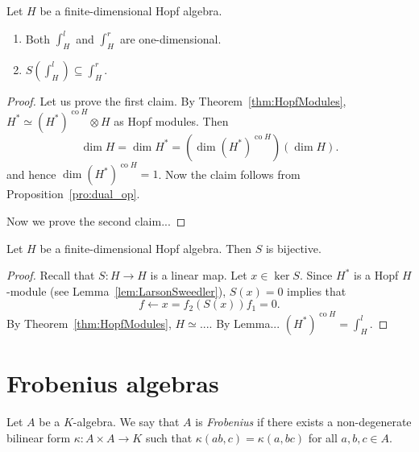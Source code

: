 \begin{theorem}
  Let $H$ be a finite-dimensional Hopf algebra. 
  \begin{enumerate}
    \item Both $\int_H^l$ and $\int_H^r$ are one-dimensional. 
    \item $S(\int_H^l)\subseteq\int_H^r$. 
  \end{enumerate}
\end{theorem}

\begin{proof}
  Let us prove the first claim. By Theorem~\ref{thm:HopfModules}, 
  $H^*\simeq (H^*)^{\operatorname{co}H}\otimes H$ as Hopf modules. Then 
  \[
    \dim H=\dim H^*=(\dim (H^*)^{\operatorname{co}H})(\dim H).
  \]
  and hence $\dim (H^*)^{\operatorname{co}H}=1$. Now 
  the claim follows from Proposition~\ref{pro:dual_op}. 

  Now we prove the second claim...
\end{proof}

\begin{example}
\end{example}

\begin{example}
\end{example}

\begin{example}
\end{example}



\begin{corollary}
  Let $H$ be a finite-dimensional Hopf algebra. Then $S$ is bijective. 
\end{corollary}

\begin{proof}
  Recall that $S\colon H\to H$ is a linear map. Let $x\in\ker S$. Since 
  $H^*$ is a Hopf $H$-module (see Lemma~\ref{lem:LarsonSweedler}), 
  $S(x)=0$ implies that
  \[
    f\leftarrow x=f_2(S(x))f_1=0. 
  \]
  By Theorem~\ref{thm:HopfModules}, $H\simeq...$. 
  By Lemma... $(H^*)^{\operatorname{co}H}=\int_{H}^l$. 
\end{proof}

\section{Frobenius algebras}

\begin{definition}
  Let $A$ be a $K$-algebra. We say that $A$ is \emph{Frobenius} if there exists
  a non-degenerate bilinear form $\kappa\colon A\times A\to K$ such that
  $\kappa(ab,c)=\kappa(a,bc)$ for all $a,b,c\in A$. 
\end{definition}

